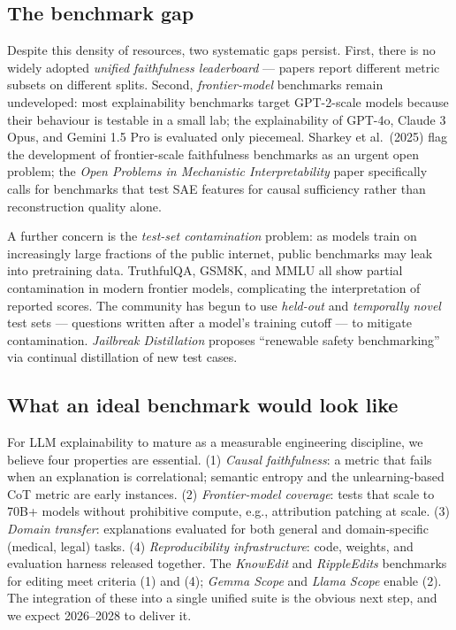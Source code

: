 \documentclass{article}
\begin{document}
\subsection{The benchmark gap}\label{the-benchmark-gap}

Despite this density of resources, two systematic gaps persist. First, there is no widely adopted \emph{unified faithfulness leaderboard} --- papers report different metric subsets on different splits. Second, \emph{frontier-model} benchmarks remain undeveloped: most explainability benchmarks target GPT-2-scale models because their behaviour is testable in a small lab; the explainability of GPT-4o, Claude 3 Opus, and Gemini 1.5 Pro is evaluated only piecemeal. Sharkey et al.~(2025) flag the development of frontier-scale faithfulness benchmarks as an urgent open problem; the \emph{Open Problems in Mechanistic Interpretability} paper specifically calls for benchmarks that test SAE features for causal sufficiency rather than reconstruction quality alone.

A further concern is the \emph{test-set contamination} problem: as models train on increasingly large fractions of the public internet, public benchmarks may leak into pretraining data. TruthfulQA, GSM8K, and MMLU all show partial contamination in modern frontier models, complicating the interpretation of reported scores. The community has begun to use \emph{held-out} and \emph{temporally novel} test sets --- questions written after a model's training cutoff --- to mitigate contamination. \emph{Jailbreak Distillation} \citep{zhang2025jailbreakdistillat} proposes ``renewable safety benchmarking'' via continual distillation of new test cases.

\subsection{What an ideal benchmark would look like}\label{what-an-ideal-benchmark-would-look-like}

For LLM explainability to mature as a measurable engineering discipline, we believe four properties are essential. (1) \emph{Causal faithfulness}: a metric that fails when an explanation is correlational; semantic entropy and the unlearning-based CoT metric are early instances. (2) \emph{Frontier-model coverage}: tests that scale to 70B+ models without prohibitive compute, e.g., attribution patching at scale. (3) \emph{Domain transfer}: explanations evaluated for both general and domain-specific (medical, legal) tasks. (4) \emph{Reproducibility infrastructure}: code, weights, and evaluation harness released together. The \emph{KnowEdit} and \emph{RippleEdits} benchmarks for editing meet criteria (1) and (4); \emph{Gemma Scope} and \emph{Llama Scope} enable (2). The integration of these into a single unified suite is the obvious next step, and we expect 2026--2028 to deliver it.
\end{document}
